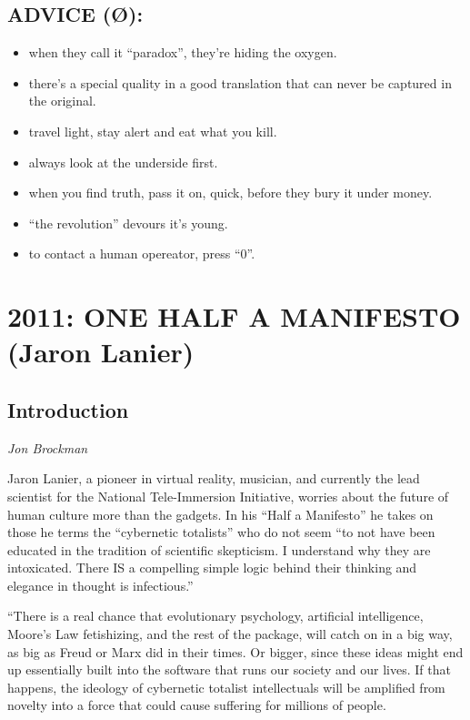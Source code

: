 \documentclass[letterpaper,12pt,english]{sphinxmanual}
\begin{document}
\section{ADVICE (Ø):}
\label{2011:advice-o}\begin{itemize}
\item {} 
when they call it ``paradox'', they're hiding the oxygen.

\item {} 
there's a special quality in a good translation that can never be captured in the original.

\item {} 
travel light, stay alert and eat what you kill.

\item {} 
always look at the underside first.

\item {} 
when you find truth, pass it on, quick, before they bury it under money.

\item {} 
``the revolution'' devours it's young.

\item {} 
to contact a human opereator, press ``0''.

\end{itemize}


\chapter{2011: ONE HALF A MANIFESTO (Jaron Lanier)}
\label{lanier:one-half-a-manifesto-jaron-lanier}\label{lanier::doc}

\section{Introduction}
\label{lanier:introduction}
\emph{Jon Brockman}

Jaron Lanier, a pioneer in virtual reality, musician, and currently the lead scientist for the National Tele-Immersion Initiative, worries about the future of human culture more than the gadgets. In his ``Half a Manifesto'' he takes on those he terms the ``cybernetic totalists'' who do not seem ``to not have been educated in the tradition of scientific skepticism. I understand why they are intoxicated. There IS a compelling simple logic behind their thinking and elegance in thought is infectious.''

``There is a real chance that evolutionary psychology, artificial intelligence, Moore's Law fetishizing, and the rest of the package, will catch on in a big way, as big as Freud or Marx did in their times. Or bigger, since these ideas might end up essentially built into the software that runs our society and our lives. If that happens, the ideology of cybernetic totalist intellectuals will be amplified from novelty into a force that could cause suffering for millions of people.
\end{document}
